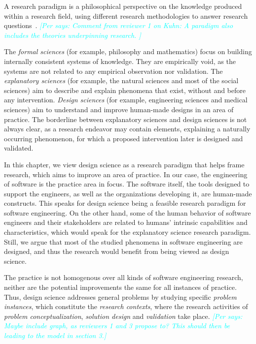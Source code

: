 \documentclass[graybox]{svmult}
\newcommand{\per}[1]{\textcolor{cyan}{{\it [Per says: #1]}}}
\newcommand{\per}[1]{}
\begin{document}
A research paradigm is a philosophical perspective on the knowledge produced within a research field, using different research methodologies to answer research questions~\cite{van_aken_management_2004}. \per{Comment from reviewer 1 on Kuhn: A  paradigm  also includes the theories underpinning research. }

The \emph{formal sciences} (for example, philosophy and mathematics) focus on building internally consistent systems of knowledge. They are empirically void, as the systems are not related to any empirical observation nor validation. The \emph{explanatory sciences} (for example, the natural sciences and most of the social sciences) aim to describe and explain phenomena that exist, without and before any intervention. \emph{Design sciences} (for example, engineering sciences and medical sciences) aim to understand and improve human-made designs in an area of practice. The borderline between explanatory sciences and design sciences is not always clear, as a research endeavor may contain elements, explaining a naturally occurring phenomenon, for which a proposed intervention later is designed and validated. 

In this chapter, we view design science as a research paradigm that helps frame research, which aims to improve an area of practice. In our case, the engineering of software is the practice area in focus. The software itself, the tools designed to support the engineers, as well as the organizations developing it, are human-made constructs. This speaks for design science being a feasible research paradigm for software engineering. On the other hand, some of the human behavior of software engineers and their stakeholders are related to humans' intrinsic capabilities and characteristics, which would speak for the explanatory science research paradigm. Still, we argue that most of the studied phenomena in software engineering are designed, and thus the research would benefit from being viewed as design science.

The practice is not homogenous over all kinds of software engineering research, neither are the potential improvements the same for all instances of practice. Thus, design science addresses general problems by studying  specific \emph{problem instances}, which constitute the \emph{research contexts}, where the research activities of \emph{problem conceptualization}, \emph{solution design} and \emph{validation} take place. \per{Maybe include graph, as reviewers 1 and 3 propose to? This should then be leading to the model in section 3.}
\end{document}
